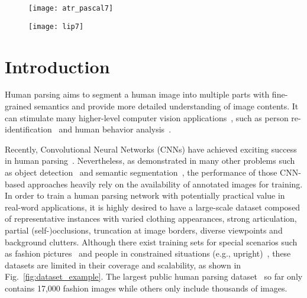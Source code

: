 \documentclass[10pt,twocolumn,letterpaper]{article}
\begin{document}
\begin{figure*}[t]
\begin{subfigure}{1.0\textwidth}
   \centering
   \texttt{[image: atr\_pascal7]}
\end{subfigure}
   \vspace{-1mm}
\begin{subfigure}{1.0\textwidth}
   \centering
   \texttt{[image: lip7]}
\end{subfigure}
\vspace{-2mm}
\caption{Annotation examples for our ``Look into Person (LIP)'' dataset and existing datasets. (a) The images in ATR dataset which are fixed in size and only contain stand-up person instances in the outdoors. (b) The images in PASCAL-Person-Part dataset which also have lower scalability and only contain 6 coarse labels. (c) The images in our LIP dataset with high appearance variability and complexity.}
\vspace{-6mm}
\label{fig:dataset_example}
\end{figure*}

\section{Introduction}
Human parsing aims to segment a human image into multiple parts with fine-grained semantics and provide more detailed understanding of image contents. It can stimulate many higher-level computer vision applications~\cite{zhang2015dynamic}, such as person re-identification~\cite{zhao2013unsupervised} and human behavior analysis~\cite{gan2016concepts,liang2015proposal}. 

Recently, Convolutional Neural Networks (CNNs) have achieved exciting success in human parsing~\cite{ATR,Co-CNN,liang2015semantic}. Nevertheless, as demonstrated in many other problems such as object detection~\cite{liang2015towards} and semantic segmentation~\cite{crfasrnn}, the performance of those CNN-based approaches heavily rely on the availability of annotated images for training. In order to train a human parsing network with potentially practical value in real-word applications, it is highly desired to have a large-scale dataset composed of representative instances with varied clothing appearances, strong articulation, partial (self-)occlusions, truncation at image borders, diverse viewpoints and background clutters. Although there exist training sets for special scenarios such as fashion pictures~\cite{Yamaguchiparsing13,Dongparsing13,ATR,Co-CNN} and people in constrained situations (e.g., upright)~\cite{chen2014detect}, these datasets are limited in their coverage and scalability, as shown in Fig.~\ref{fig:dataset_example}. The largest public human parsing dataset~\cite{Co-CNN} so far only contains 17,000 fashion images while others only include thousands of images. 
\end{document}

